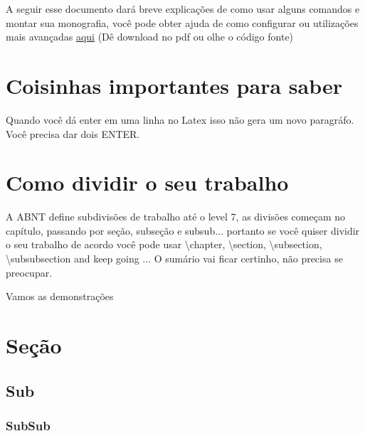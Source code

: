 A seguir esse documento dará breve explicações de como usar alguns comandos e montar sua monografia,
 você pode obter ajuda de como configurar ou utilizações mais avançadas 
 \href{http://ctan.sharelatex.com/tex-archive/macros/latex/contrib/abntex2/doc/abntex2.pdf}{aqui} 
 (Dê download no pdf ou olhe o código fonte)

\section{Coisinhas importantes para saber}
	Quando você dá enter em uma linha no Latex isso não gera um novo paragráfo. Você precisa dar
	dois ENTER. 

\section{Como dividir o seu trabalho}
	A ABNT define subdivisões de trabalho até o level 7, as divisões começam no capítulo, 
	passando por seção, subseção e subsub... portanto se você quiser dividir o seu trabalho de acordo 
	você pode usar \textbackslash chapter, \textbackslash section, \textbackslash subsection, \textbackslash subsubsection 
	and keep going ... O sumário vai ficar certinho, não precisa se preocupar.


	Vamos as demonstrações
\section{Seção}
\subsection{Sub}
\subsubsection{SubSub}
